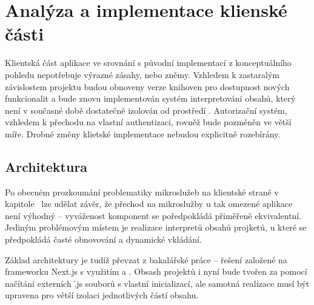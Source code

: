 \chapter{Analýza a implementace klienské části}\label{ch:client}


Klientská část aplikace ve srovnání s původní implementací z konceptuálního pohledu nepotřebuje výrazné zásahy, nebo zněmy.
Vzhledem k zastaralým závislostem projektu budou obnoveny verze knihoven pro dostupnost nových funkcionalit a bude znovu implementován systém interpretování obsahů, který není v současné době dostatečně izolován od prostředí .
Autorizační systém, vzhledem k přechodu na vlastní authentizaci, rovněž bude pozměněn ve větší míře.
Drobné změny klietské implementace nebudou explicitně rozebírány.



\section{Architektura}\label{sec:client-arch}
Po obecném prozkoumání problematiky mikroslužeb na klientské straně v kapitole~ lze udělat závěr, že přechod na mikroslužby u tak omezené aplikace není výhodný – vyváženost komponent se poředpokládá přiměřeně ekvivalentní.
Jediným problémovým místem je realizace interpretů obsahů projketů, u které se předpokládá časté obnovování a dynamické vkládání.

Základ architektury je tudíž převzat z bakalářské práce – řešení založené na frameworku Next.js s využitím  a .
Obsash projektů i nyní bude tvořen za pomocí načítání externích \h{.js} souborů s vlastní inicializací, ale samotná realizace musí být upravena pro větší izolaci jednotlivých částí obsahu.



